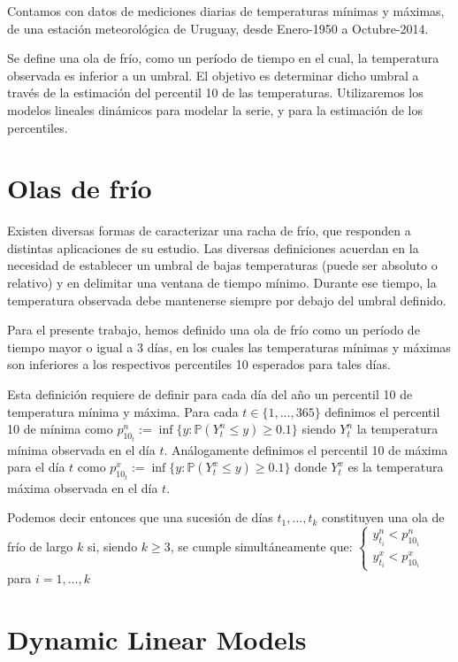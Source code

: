 \documentclass{article}\usepackage[]{graphicx}\usepackage[]{color}
\newcommand{\p}{\mathbb{P}}
\begin{document}
Contamos con datos de mediciones diarias de temperaturas mínimas y máximas, de una estación meteorológica de Uruguay, desde Enero-1950 a Octubre-2014.

Se define una ola de frío, como un período de tiempo en el cual, la temperatura observada es inferior a un umbral. El objetivo es determinar dicho umbral a través de la estimación del percentil 10 de las temperaturas. Utilizaremos los modelos lineales dinámicos para modelar la serie, y para la estimación de los percentiles.

\section{Olas de frío}

Existen diversas formas de caracterizar una racha de frío, que responden a distintas aplicaciones de su estudio. Las diversas definiciones acuerdan en la necesidad de establecer un umbral de bajas temperaturas (puede ser absoluto o relativo) y en delimitar una ventana de tiempo mínimo. Durante ese tiempo, la temperatura observada debe mantenerse siempre por debajo del umbral definido.

Para el presente trabajo, hemos definido una ola de frío como un período de tiempo mayor o igual a 3 días, en los cuales las temperaturas mínimas y máximas son inferiores a los respectivos percentiles 10 esperados para tales días.

Esta definición requiere de definir para cada día del año un percentil 10 de temperatura mínima y máxima. Para cada $t \in \{1,\dots, 365\}$ definimos el percentil 10 de mínima como $p^n_{10_t}:= \inf\{y: \p(Y^n_t \leq y)\geq 0.1\}$ siendo $Y^n_t$ la temperatura mínima observada en el día $t$. Análogamente definimos el percentil 10 de máxima para el día $t$ como $p^x_{10_t}:= \inf\{y: \p(Y^x_t \leq y)\geq 0.1\}$ donde $Y^x_t$ es la temperatura máxima observada en el día $t$.

Podemos decir entonces que una sucesión de días $t_1, \dots, t_k$ constituyen una ola de frío de largo $k$ si, siendo $k\geq 3$, se cumple simultáneamente que:
$\begin{cases} y^n_{t_i} < p^n_{10_i}  \\ y^x_{t_i} < p^x_{10_i} \end{cases}$ para $i=1,\dots,k$

\section{Dynamic Linear Models}
\end{document}
